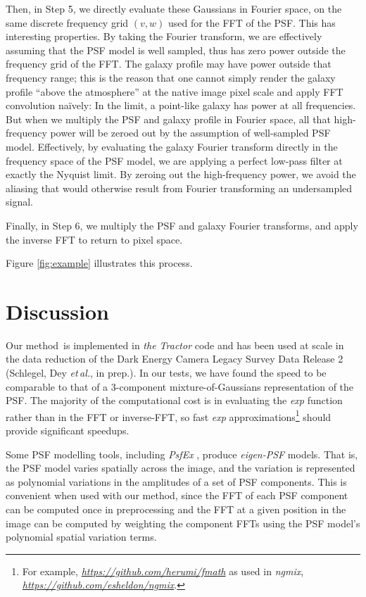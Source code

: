 \documentclass[11pt,preprint]{aastex}
\newcommand{\foreign}[1]{\emph{#1}}
\newcommand{\etal}{\foreign{et\,al.}}
\newcommand{\niceurl}[1]{\href{#1}{\textsl{#1}}}
\newcommand{\project}[1]{\textsl{#1}}
\newcommand{\trick}{method}
\begin{document}


Then, in Step 5, we directly evaluate these Gaussians in Fourier
space, on the same discrete frequency grid $(v, w)$ used for the FFT
of the PSF.  This has interesting properties.  By taking the Fourier
transform, we are effectively assuming that the PSF model is well
sampled, thus has zero power outside the frequency grid of the FFT.
The galaxy profile may have power outside that frequency range; this
is the reason that one cannot simply render the galaxy profile ``above
the atmosphere'' at the native image pixel scale and apply FFT
convolution na\"ively: In the limit, a point-like galaxy has power at
all frequencies.  But when we multiply the PSF and galaxy profile in
Fourier space, all that high-frequency power will be zeroed out by the
assumption of well-sampled PSF model.  Effectively, by evaluating the
galaxy Fourier transform directly in the frequency space of the PSF
model, we are applying a perfect low-pass filter at exactly the
Nyquist limit.  By zeroing out the high-frequency power, we avoid the
aliasing that would otherwise result from Fourier transforming an
undersampled signal.
%

Finally, in Step 6, we multiply the PSF and galaxy Fourier transforms,
and apply the inverse FFT to return to pixel space.

Figure \ref{fig:example} illustrates this process.

\section{Discussion}

Our \trick\ is implemented in \project{the Tractor} code and has been
used at scale in the data reduction of the Dark Energy Camera Legacy
Survey Data Release 2 (Schlegel, Dey \etal, in prep.).  In our tests, we
have found the speed to be comparable to that of a 3-component
mixture-of-Gaussians representation of the PSF.  The majority of the
computational cost is in evaluating the \emph{exp} function rather
than in the FFT or inverse-FFT, so fast \emph{exp} approximations\footnote{%
For example, \niceurl{https://github.com/herumi/fmath} as used in
\project{ngmix}, \niceurl{https://github.com/esheldon/ngmix}.}
should provide significant speedups.


Some PSF modelling tools, including \project{PsfEx} \citep{psfex},
produce \emph{eigen-PSF} models.  That is, the PSF model varies
spatially across the image, and the variation is represented as
polynomial variations in the amplitudes of a set of PSF components.
This is convenient when used with our \trick, since the FFT of each
PSF component can be computed once in preprocessing and the FFT at a
given position in the image can be computed by weighting the component
FFTs using the PSF model's polynomial spatial variation terms.
\end{document}
